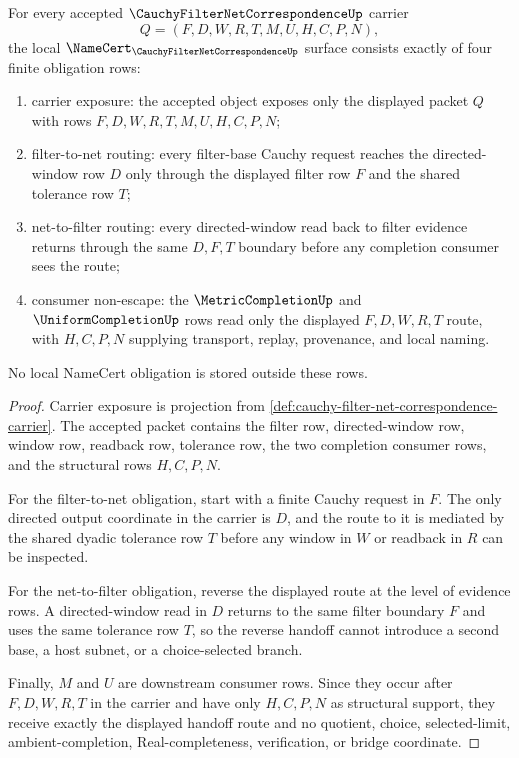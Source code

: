 \begin{theorem}
\label{thm:cauchy-filter-net-correspondence-namecert-obligations}
For every accepted $\CauchyFilterNetCorrespondenceUp$ carrier
$$
Q=(F,D,W,R,T,M,U,H,C,P,N),
$$
the local $\NameCert_{\CauchyFilterNetCorrespondenceUp}$ surface consists exactly of four finite obligation rows:
\begin{enumerate}
\item carrier exposure: the accepted object exposes only the displayed packet $Q$ with rows $F,D,W,R,T,M,U,H,C,P,N$;
\item filter-to-net routing: every filter-base Cauchy request reaches the directed-window row $D$ only through the displayed filter row $F$ and the shared tolerance row $T$;
\item net-to-filter routing: every directed-window read back to filter evidence returns through the same $D,F,T$ boundary before any completion consumer sees the route;
\item consumer non-escape: the $\MetricCompletionUp$ and $\UniformCompletionUp$ rows read only the displayed $F,D,W,R,T$ route, with $H,C,P,N$ supplying transport, replay, provenance, and local naming.
\end{enumerate}
No local NameCert obligation is stored outside these rows.
\end{theorem}
\begin{proof}
Carrier exposure is projection from \autoref{def:cauchy-filter-net-correspondence-carrier}. The accepted packet contains the filter row, directed-window row, window row, readback row, tolerance row, the two completion consumer rows, and the structural rows $H,C,P,N$.

For the filter-to-net obligation, start with a finite Cauchy request in $F$. The only directed output coordinate in the carrier is $D$, and the route to it is mediated by the shared dyadic tolerance row $T$ before any window in $W$ or readback in $R$ can be inspected.

For the net-to-filter obligation, reverse the displayed route at the level of evidence rows. A directed-window read in $D$ returns to the same filter boundary $F$ and uses the same tolerance row $T$, so the reverse handoff cannot introduce a second base, a host subnet, or a choice-selected branch.

Finally, $M$ and $U$ are downstream consumer rows. Since they occur after $F,D,W,R,T$ in the carrier and have only $H,C,P,N$ as structural support, they receive exactly the displayed handoff route and no quotient, choice, selected-limit, ambient-completion, Real-completeness, verification, or bridge coordinate.
\end{proof}

